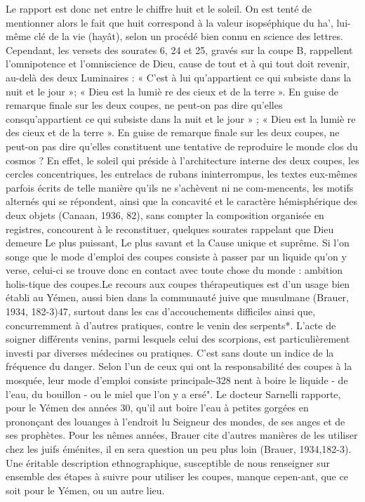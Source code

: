Le rapport est donc net entre le chiffre huit et le soleil. On est tenté de mentionner alors le fait que huit correspond à la valeur isopséphique du ha', lui-même clé de la vie (hayât), selon un procédé bien connu en science des lettres. Cependant, les versets des sourates 6, 24 et 25, gravés sur la coupe B, rappellent l'omnipotence et l'omniscience de Dieu, cause de tout et à qui tout doit revenir, au-delà des deux Luminaires : « C'est à lui qu'appartient ce qui subsiste dans la nuit et le jour »; « Dieu est la lumiè re des cieux et de la terre ».
En guise de remarque finale sur les deux coupes, ne peut-on pas dire qu'elles consqu'appartient ce qui subsiste dans la nuit et le jour » ; « Dieu est la lumiè re des cieux et de la terre ».
En guise de remarque finale sur les deux coupes, ne peut-on pas dire qu'elles constituent une tentative de reproduire le monde clos du cosmos ?
En effet, le soleil qui préside à l'architecture interne des deux coupes, les cercles concentriques, les entrelacs de rubans ininterrompus, les textes eux-mêmes parfois écrits de telle manière qu'ils ne s'achèvent ni ne com-mencents, les motifs alternés qui se répondent, ainsi que la concavité et le caractère hémisphérique des deux objets (Canaan, 1936, 82), sans compter la composition organisée en registres, concourent à le reconstituer, quelques sourates rappelant que Dieu demeure Le plus puissant, Le plus savant et la Cause unique et suprême. Si l'on songe que le mode d'emploi des coupes consiste à passer par un liquide qu'on y verse, celui-ci se trouve donc en contact avec toute chose du monde : ambition holis-tique des coupes.Le recours aux coupes thérapeutiques est d'un usage bien établi au
Yémen, aussi bien dans la communauté juive que musulmane (Brauer, 1934, 182-3)47, surtout dans les cas d'accouchements difficiles ainsi que, concurremment à d'autres pratiques, contre le venin des serpents*. L'acte de soigner différents venins, parmi lesquels celui des scorpions, est particulièrement investi par diverses médecines ou pratiques. C'est sans doute un indice de la fréquence du danger. Selon l'un de ceux qui ont la responsabilité des coupes à la mosquée, leur mode d'emploi consiste principale-328
nent à boire le liquide - de l'eau, du bouillon - ou le miel que l'on y a ersé". Le docteur Sarnelli rapporte, pour le Yémen des années 30, qu'il aut boire l'eau à petites gorgées en prononçant des louanges à l'endroit lu Seigneur des mondes, de ses anges et de ses prophètes. Pour les nêmes années, Brauer cite d'autres manières de les utiliser chez les juifs éménites, il en sera question un peu plus loin (Brauer, 1934,182-3). Une éritable description ethnographique, susceptible de nous renseigner sur ensemble des étapes à suivre pour utiliser les coupes, manque cepen-ant, que ce soit pour le Yémen, ou un autre lieu.
